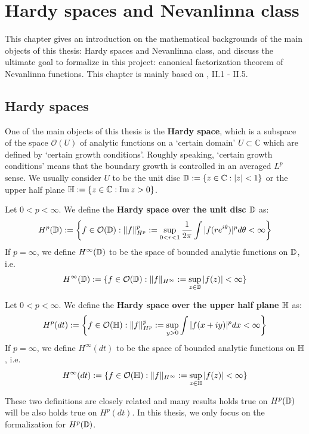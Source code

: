 
\chapter{Hardy spaces and Nevanlinna class}
\label{sec:hardy_nevanlinna}
This chapter gives an introduction on the mathematical backgrounds of
the main objects of this thesis: Hardy spaces and 
Nevanlinna class, and discuss the ultimate goal to formalize in
this project: canonical factorization theorem of Nevanlinna functions. This chapter is
mainly based on \cite{garnett2006bounded}, II.1 - II.5.

\section{Hardy spaces}
One of the main objects of this thesis is the \textbf{Hardy space}, which is a subspace of the space 
$\mathcal{O}(U)$ of analytic functions
on a `certain domain' $U\subset \mathbb{C}$ which are defined by 
`certain growth conditions'. Roughly speaking,
`certain growth conditions' means that the boundary growth is controlled in 
an averaged $L^p$ sense. We usually consider
$U$ to be the unit disc $\mathbb{D}:=\{z\in\mathbb{C}: |z|<1\}$ or the upper half plane 
$\mathbb{H}:=\{z\in\mathbb{C}: \operatorname{Im} z>0\}$.

\begin{definition}
Let $0<p<\infty$. We define the \textbf{Hardy space over the unit disc $\mathbb{D}$} as:
\begin{equation*}
  H^p(\mathbb{D}):=\left\{ f\in \mathcal{O}(\mathbb{D}):\| f\|_{H^p}^p := \sup_{0<r<1}\frac{1}{2\pi}\int |f(re^{i\theta})|^p d
  \theta <\infty\right\}
\end{equation*}
If $p=\infty$, we define $H^\infty(\mathbb{D})$ to be the space of bounded analytic functions on $\mathbb{D}$, i.e.
\begin{equation*}
  H^\infty(\mathbb{D}):=\{f\in \mathcal{O}(\mathbb{D}): \|f\|_{H^\infty}:=\sup_{z\in \mathbb{D}}|f(z)|<\infty\}
\end{equation*}
\end{definition}

\begin{definition}
Let $0<p<\infty$. We define the \textbf{Hardy space over the upper half plane $\mathbb{H}$} as:
\begin{equation*}
  H^p(dt):=\left\{f\in \mathcal{O}(\mathbb{H}): \|f\|_{H^p}^p:=\sup_{y>0}\int |f(x+iy)|^p dx <\infty\right\}
\end{equation*}
If $p=\infty$, we define $H^\infty(dt)$ to be the space of bounded analytic functions on $\mathbb{H}$, i.e.
\begin{equation*}
  H^\infty(dt):=\{f\in \mathcal{O}(\mathbb{H}): \|f\|_{H^\infty}:=\sup_{z\in \mathbb{H}}|f(z)|<\infty\}
\end{equation*}
\end{definition}
These two definitions are closely related and many results holds true on $H^p(\mathbb{D})$ will be also holds
true on $H^p(dt)$. In this thesis, we only focus on the formalization for $H^p(\mathbb{D})$.

